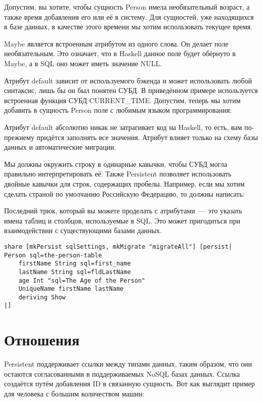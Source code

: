 Допустим, вы хотите, чтобы сущность Person имела необязательный возраст, а также время добавления его или её в систему. Для сущностей, уже находящихся в базе данных, в качестве этого времени мы хотим использовать текущее время.


Maybe является встроенным атрибутом из одного слова. Он делает поле необязательным. Это означает, что в Haskell данное поле будет обёрнуто в Maybe, а в SQL оно может иметь значение NULL.

Атрибут default зависит от используемого бэкенда и может использовать любой синтаксис, лишь бы он был понятен СУБД. В приведённом примере используется встроенная функция СУБД CURRENT\_TIME. Допустим, теперь мы хотим добавить в сущность Person поле с любимым языком программирования:


\begin{remark}
Атрибут default абсолютно никак не затрагивает код на Haskell, то есть, вам по-прежнему придётся заполнять все значения. Атрибут влияет только на схему базы данных и автоматические миграции.
\end{remark}

Мы должны окружить строку в одинарные кавычки, чтобы СУБД могла правильно интерпретировать её. Также Persistent позволяет использовать двойные кавычки для строк, содержащих пробелы. Например, если мы хотим сделать страной по умолчанию Российскую Федерацию, то должны написать:


Последний трюк, который вы можете проделать с атрибутами~--- это указать имена таблиц и столбцов, используемые в SQL. Это может пригодиться при взаимодействии с существующими базами данных.

\begin{lstlisting}
share [mkPersist sqlSettings, mkMigrate "migrateAll"] [persist|
Person sql=the-person-table
    firstName String sql=first_name
    lastName String sql=fldLastName
    age Int "sql=The Age of the Person"
    UniqueName firstName lastName
    deriving Show
|]
\end{lstlisting}

\section{Отношения}

Persistent поддерживает ссылки между типами данных, таким образом, что они остаются согласованными в поддерживаемых NoSQL базах данных. Ссылка создаётся путём добавления ID в связанную сущность. Вот как выглядит пример для человека с большим количеством машин:

